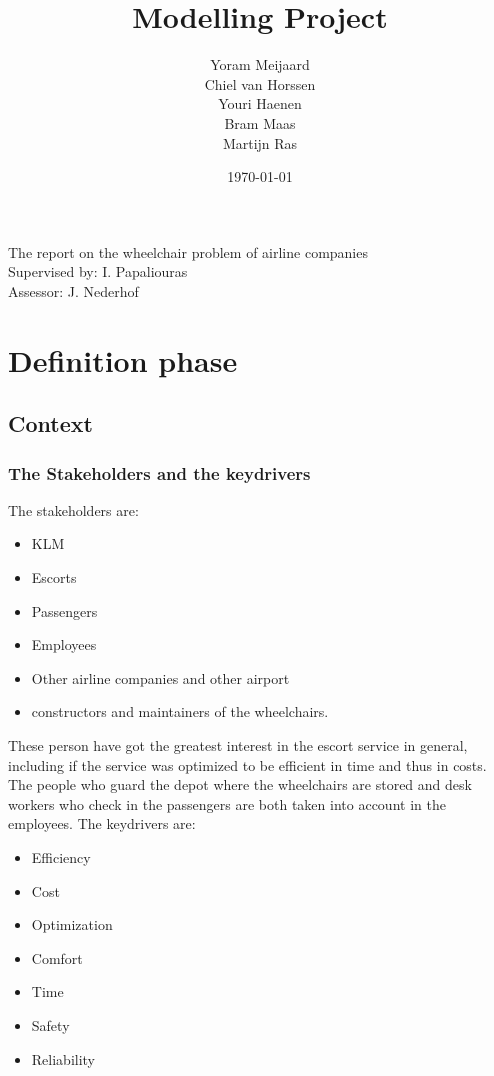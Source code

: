 \documentclass[a4paper, 12pt, notitlepage]{report}
\title{{\Huge Modelling Project} \vspace{290pt}} %
\author{Yoram Meijaard\\Chiel van Horssen\\Youri Haenen\\Bram Maas\\Martijn Ras} %
\date{\today} %
\begin{document}
\maketitle
\begin{center}
The report on the wheelchair problem of airline companies %
\\[12pt]
Supervised by: I. Papaliouras \\ Assessor: J. Nederhof %
\end{center}
\thispagestyle{empty}
\newpage


\tableofcontents




\chapter{Definition phase}
\section{Context}
\subsection{The Stakeholders and the keydrivers }
The stakeholders are:
\begin{itemize}
 \item KLM
 \item Escorts
 \item Passengers
 \item Employees
 \item Other airline companies and other airport
 \item  constructors and maintainers of the wheelchairs.
\end{itemize}
These person have got the greatest interest in the escort service in general, including if the service was optimized to be efficient in time and thus in costs. The people who guard the depot where the wheelchairs are stored and desk workers who check in the passengers are both taken into account in the employees. The keydrivers are:
\begin{itemize}
	\item Efficiency
	\item Cost
	\item Optimization
	\item Comfort
	\item Time
	\item Safety
	\item Reliability
\end{itemize}
\end{document}
